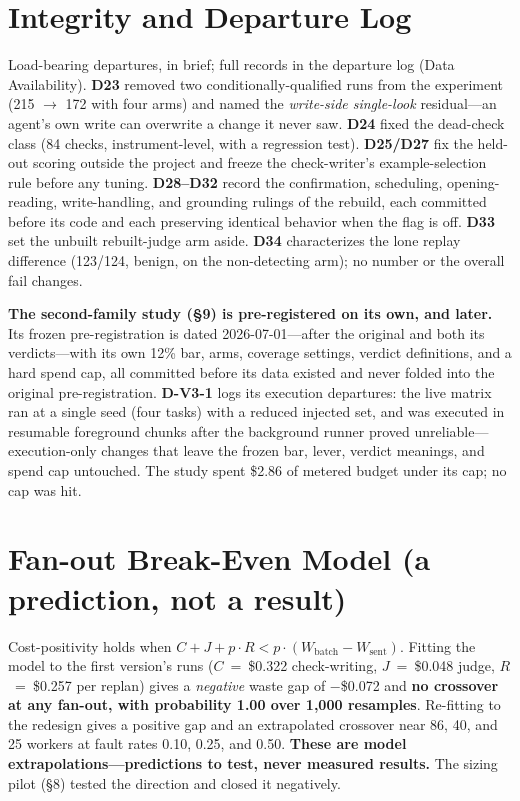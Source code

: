 \documentclass[acmsmall,screen]{acmart}
\begin{document}
\appendix

\section{Integrity and Departure Log}
Load-bearing departures, in brief; full records in the departure log (Data
Availability). \textbf{D23} removed two conditionally-qualified runs from the
experiment (215 $\rightarrow$ 172 with four arms) and named the \emph{write-side
single-look} residual---an agent's own write can overwrite a change it never
saw. \textbf{D24} fixed the dead-check class (84 checks, instrument-level, with a
regression test). \textbf{D25/D27} fix the held-out scoring outside the project
and freeze the check-writer's example-selection rule before any tuning.
\textbf{D28--D32} record the confirmation, scheduling, opening-reading,
write-handling, and grounding rulings of the rebuild, each committed before its
code and each preserving identical behavior when the flag is off. \textbf{D33}
set the unbuilt rebuilt-judge arm aside. \textbf{D34} characterizes the lone
replay difference (123/124, benign, on the non-detecting arm); no number or the
overall fail changes.

\textbf{The second-family study (\S9) is pre-registered on its own, and later.}
Its frozen pre-registration is dated 2026-07-01---after the original and both its
verdicts---with its own 12\% bar, arms, coverage settings, verdict definitions,
and a hard spend cap, all committed before its data existed and never folded into
the original pre-registration. \textbf{D-V3-1} logs its execution departures: the
live matrix ran at a single seed (four tasks) with a reduced injected set, and
was executed in resumable foreground chunks after the background runner proved
unreliable---execution-only changes that leave the frozen bar, lever, verdict
meanings, and spend cap untouched. The study spent \$2.86 of metered budget under
its cap; no cap was hit.

\section{Fan-out Break-Even Model (a prediction, not a result)}
Cost-positivity holds when
$C + J + p\cdot R < p\cdot(W_{\mathrm{batch}} - W_{\mathrm{sent}})$. Fitting the
model to the first version's runs ($C$~=~\$0.322 check-writing, $J$~=~\$0.048
judge, $R$~=~\$0.257 per replan) gives a \emph{negative} waste gap of
$-$\$0.072 and \textbf{no crossover at any fan-out, with probability 1.00 over
1,000 resamples}. Re-fitting to the redesign gives a positive gap and an
extrapolated crossover near 86, 40, and 25 workers at fault rates 0.10, 0.25,
and 0.50. \textbf{These are model extrapolations---predictions to test, never
measured results.} The sizing pilot (\S8) tested the direction and closed it
negatively.
\end{document}
